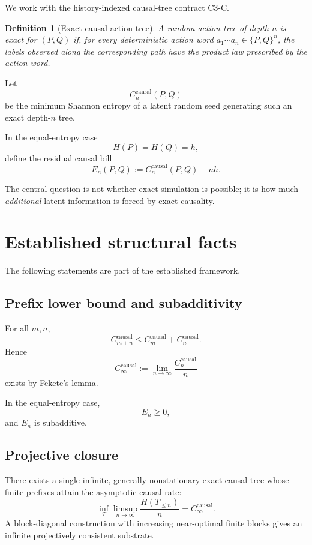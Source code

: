 \documentclass[11pt,a4paper]{article}
\newtheorem{definition}[theorem]{Definition}
\begin{document}
We work with the history-indexed causal-tree contract C3-C.

\begin{definition}[Exact causal action tree]
A random action tree of depth \(n\) is exact for \((P,Q)\) if, for every
deterministic action word \(a_1\cdots a_n\in\{P,Q\}^n\), the labels observed
along the corresponding path have the product law prescribed by the action
word.
\end{definition}

Let
\[
C_n^{\mathrm{causal}}(P,Q)
\]
be the minimum Shannon entropy of a latent random seed generating such an
exact depth-\(n\) tree.

In the equal-entropy case
\[
H(P)=H(Q)=h,
\]
define the residual causal bill
\[
\boxed{
E_n(P,Q):=
C_n^{\mathrm{causal}}(P,Q)-nh.
}
\]

The central question is not whether exact simulation is possible; it is
how much \emph{additional} latent information is forced by exact causality.

\section{Established structural facts}

The following statements are part of the established framework.

\subsection{Prefix lower bound and subadditivity}

For all \(m,n\),
\[
C_{m+n}^{\mathrm{causal}}
\le
C_m^{\mathrm{causal}}+C_n^{\mathrm{causal}}.
\]
Hence
\[
C_\infty^{\mathrm{causal}}
:=
\lim_{n\to\infty}\frac{C_n^{\mathrm{causal}}}{n}
\]
exists by Fekete's lemma.

In the equal-entropy case,
\[
E_n\ge0,
\]
and \(E_n\) is subadditive.

\subsection{Projective closure}

There exists a single infinite, generally nonstationary exact causal tree
whose finite prefixes attain the asymptotic causal rate:
\[
\inf_T
\limsup_{n\to\infty}
\frac{H(T_{\le n})}{n}
=
C_\infty^{\mathrm{causal}}.
\]
A block-diagonal construction with increasing near-optimal finite blocks
gives an infinite projectively consistent substrate.
\end{document}
